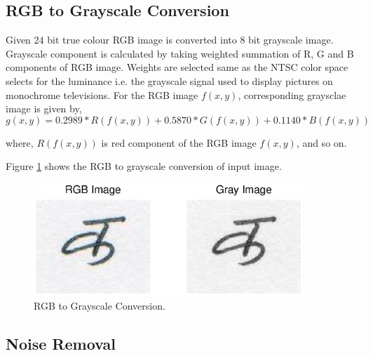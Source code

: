 

\subsection{RGB to Grayscale Conversion}\label{section_rgb_to_gray_conversion}

Given $24$ bit true colour RGB image is converted into $8$ bit grayscale image. Grayscale component is calculated by taking weighted summation of R, G and B components of RGB image. Weights are selected same as the NTSC color space selects for the luminance i.e. the grayscale signal used to display pictures on monochrome televisions. For the RGB image $f(x,y)$, corresponding graysclae image is given by,
\begin{equation}
g(x,y)= 0.2989 * R(f(x,y)) + 0.5870 *G(f(x,y)) + 0.1140 * B(f(x,y))
\end{equation}

where, $R(f(x,y))$ is red component of the RGB image $f(x,y)$, and so on.

Figure \ref{figure_grayed} shows the RGB to grayscale conversion of input image.
\begin{figure}[h]
\centering
\includegraphics[width=4in]{figures/ka_preprocessing/grayed.eps}
\caption{RGB to Grayscale Conversion.}
\label{figure_grayed}
\end{figure}


\subsection{Noise Removal}\label{section_noise_removal}

